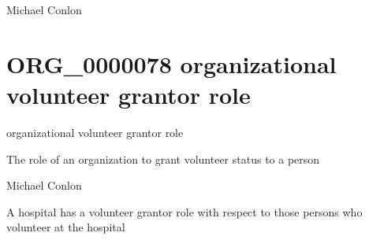 \documentclass[letterpaper,10pt,english]{sphinxmanual}
\begin{document}
\begin{sphinxShadowBox}

\sphinxAtStartPar
Michael Conlon 
\end{sphinxShadowBox}
\begin{quote}
\label{\detokenize{doc-ORG_0000078:org-0000078}}\label{\detokenize{doc-ORG_0000078:organizational-volunteer-grantor-role}}\label{\detokenize{doc-ORG_0000078:org-0000078}}
\ignorespaces \end{quote}


\section{ORG\_0000078 \sphinxhyphen{} organizational volunteer grantor role}
\label{\detokenize{doc-ORG_0000078:org-0000078-organizational-volunteer-grantor-role}}\label{\detokenize{doc-ORG_0000078:index-0}}\label{\detokenize{doc-ORG_0000078::doc}}
\begin{sphinxShadowBox}

\sphinxAtStartPar
organizational volunteer grantor role
\end{sphinxShadowBox}

\begin{sphinxShadowBox}

\sphinxAtStartPar
The role of an organization to grant volunteer status to a person
\end{sphinxShadowBox}

\begin{sphinxShadowBox}

\sphinxAtStartPar
Michael Conlon 
\end{sphinxShadowBox}

\begin{sphinxShadowBox}

\sphinxAtStartPar
A hospital has a volunteer grantor role with respect to those persons who volunteer at the hospital
\end{sphinxShadowBox}
\end{document}
